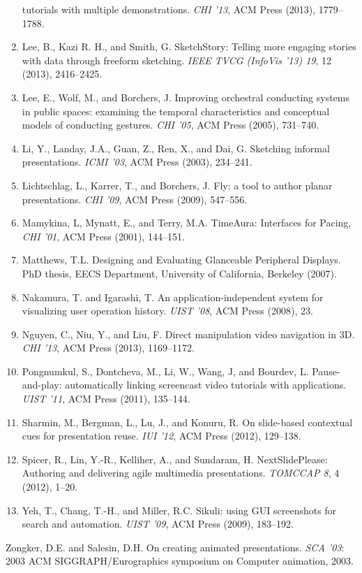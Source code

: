 \begin{enumerate}
tutorials with multiple demonstrations. \textit{CHI ’13}, ACM Press (2013), 1779–1788.
\item \label{bkm:Ref376628041}Lee, B., Kazi R. H., and Smith, G. SketchStory: Telling more engaging stories with data
through freeform sketching. \textit{IEEE TVCG (InfoVis ’13) 19}, 12 (2013), 2416–2425.
\item \label{bkm:Ref367064478}Lee, E., Wolf, M., and Borchers, J. Improving orchestral conducting systems in public
spaces: examining the temporal characteristics and conceptual models of conducting gestures. \textit{CHI ’05}, ACM
Press (2005), 731–740.
\item \label{bkm:Ref240137549}Li, Y., Landay, J.A., Guan, Z., Ren, X., and Dai, G. Sketching informal presentations.
\textit{ICMI ’03}, ACM Press (2003), 234–241.
\item \label{bkm:Ref240447518}Lichtschlag, L., Karrer, T., and Borchers, J. Fly: a tool to author planar presentations.
\textit{CHI ’09}, ACM Press (2009), 547–556.
\item \label{bkm:Ref376625490}Mamykina, L, Mynatt, E., and Terry, M.A. TimeAura: Interfaces for Pacing, \textit{CHI
’01}, ACM Press (2001), 144–151.
\item \label{bkm:Ref240567330}Matthews, T.L. Designing and Evaluating Glanceable Peripheral Displays. PhD thesis, EECS
Department, University of California, Berkeley (2007).
\item \label{bkm:Ref240108051}Nakamura, T. and Igarashi, T. An application-independent system for visualizing user
operation history. \textit{UIST ’08}, ACM Press (2008), 23.
\item \label{bkm:Ref240444584}Nguyen, C., Niu, Y., and Liu, F. Direct manipulation video navigation in 3D. \textit{CHI
’13}, ACM Press (2013), 1169–1172.
\item \label{bkm:Ref240108248}Pongnumkul, S., Dontcheva, M., Li, W., Wang, J, and Bourdev, L. Pause-and-play:
automatically linking screencast video tutorials with applications. \textit{UIST ’11}, ACM Press (2011), 135–144.
\item \label{bkm:Ref240136999}Sharmin, M., Bergman, L., Lu, J., and Konuru, R. On slide-based contextual cues for
presentation reuse. \textit{IUI ’12}, ACM Press (2012), 129–138.
\item \label{bkm:Ref240136962}Spicer, R., Lin, Y.-R., Kelliher, A., and Sundaram, H. NextSlidePlease: Authoring and
delivering agile multimedia presentations. \textit{TOMCCAP 8}, 4 (2012), 1–20.
\item \label{bkm:Ref240442208}Yeh, T., Chang, T.-H., and Miller, R.C. Sikuli: using GUI screenshots for search and
automation. \textit{UIST ’09}, ACM Press (2009), 183–192.
\end{enumerate}
\label{bkm:Ref240137511}Zongker, D.E. and Salesin, D.H. On creating animated presentations. \textit{SCA ’03}: 2003 ACM
SIGGRAPH/Eurographics symposium on Computer animation, 2003.
\endinput
